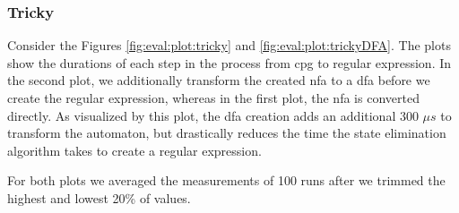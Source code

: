 \subsubsection{Tricky}

Consider the Figures \ref{fig:eval:plot:tricky} and \ref{fig:eval:plot:trickyDFA}. 
The plots show the durations of each step in the process from \ac{cpg} to regular expression. 
In the second plot, we additionally transform the created \ac{nfa} to a \ac{dfa} before we create the regular expression, whereas in the first plot, the \ac{nfa} is converted directly. As visualized by this plot, the \ac{dfa} creation adds an additional 300 $\mu s$ to transform the automaton, but drastically reduces the time the state elimination algorithm takes to create a regular expression.

For both plots we averaged the measurements of 100 runs after we trimmed the highest and lowest 20\% of values.



